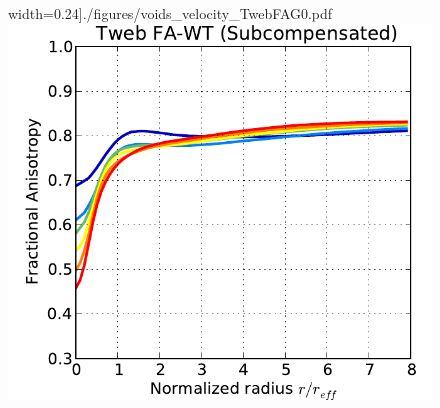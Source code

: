 \documentclass[a4,useAMS,usenatbib,usegraphicx]{latex/mn2e}
\begin{document}
\begin{flushleft}
\begin{figure}
  width=0.24\textheight]{./figures/voids_velocity_TwebFAG0.pdf}
  \includegraphics[trim = 1mm 0mm 5mm 0mm, clip, keepaspectratio=true,
  width=0.24\textheight]{./figures/voids_FA_TwebFAG0.pdf}
  

\end{figure}
\end{flushleft}
\end{document}
